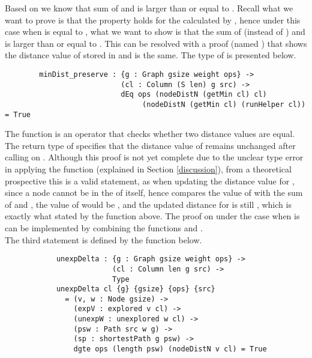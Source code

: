 Based on  we know that sum of  and  is larger than or equal to . Recall what we want to prove is that the property  holds for the  calculated by , hence under this case when  is equal to , what we want to show is that the sum of (instead of ) and  is larger than or equal to . This can be resolved with a proof (named ) that shows the distance value of  stored in  and  is the same. The type of  is presented below. 
\begin{lstlisting}
		minDist_preserve : {g : Graph gsize weight ops} ->
		                   (cl : Column (S len) g src) ->
		                   dEq ops (nodeDistN (getMin cl) cl) 
		                   		(nodeDistN (getMin cl) (runHelper cl)) = True
\end{lstlisting}

The function  is an operator that checks whether two distance values are equal. The return type of  specifies that the distance value of  remains unchanged after calling  on . Although this proof is not yet complete due to the unclear type error in applying the  function (explained in Section \ref{discussion}), from a theoretical prospective this is a valid statement, as when updating the distance value for , since a node cannot be in the  of itself, hence  compares the value of  with the sum of  and , the value of  would be , and the updated distance for  is still , which is exactly what stated by the  function above. The proof on  under the case when  is  can be implemented by combining the functions  and . 
\\

The third statement is defined by the  function below. 
\begin{lstlisting}
			unexpDelta : {g : Graph gsize weight ops} ->
			             (cl : Column len g src) ->
			             Type
			unexpDelta cl {g} {gsize} {ops} {src}
			  = (v, w : Node gsize) ->
			    (expV : explored v cl) ->
			    (unexpW : unexplored w cl) ->
			    (psw : Path src w g) ->
			    (sp : shortestPath g psw) ->
			    dgte ops (length psw) (nodeDistN v cl) = True
\end{lstlisting}


